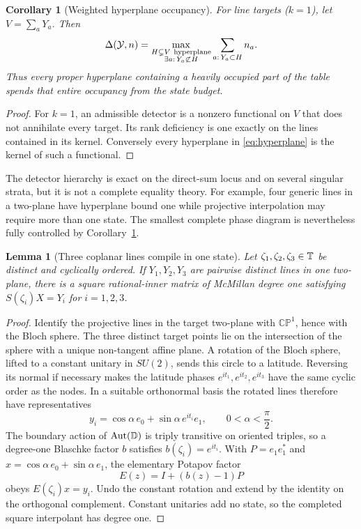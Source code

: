 \documentclass[11pt]{article}
\newtheorem{lemma}[theorem]{Lemma}
\newtheorem{corollary}[theorem]{Corollary}
\theoremstyle{definition}\newtheorem{definition}[theorem]{Definition}\newtheorem{example}[theorem]{Example}
\theoremstyle{remark}\newtheorem{remark}[theorem]{Remark}\newtheorem{limitation}[theorem]{Limitation}
\begin{document}
\begin{corollary}[Weighted hyperplane occupancy]\label{cor:hyperplane}
For line targets ($k=1$), let $V=\sum_aY_a$.  Then
\begin{equation}\label{eq:hyperplane}
 \Delta(\mathcal Y,n)=
 \max_{\substack{H\subsetneq V\ {\rm hyperplane}\\
                  \exists a:\,Y_a\not\subset H}}
       \sum_{a:\,Y_a\subset H}n_a.
\end{equation}
Thus every proper hyperplane containing a heavily occupied part of the table
spends that entire occupancy from the state budget.
\end{corollary}

\begin{proof}
For $k=1$, an admissible detector is a nonzero functional on $V$ that does
not annihilate every target.  Its rank deficiency is one exactly on the
lines contained in its kernel.  Conversely every hyperplane in
\eqref{eq:hyperplane} is the kernel of such a functional.
\end{proof}

The detector hierarchy is exact on the direct-sum locus and on several
singular strata, but it is not a complete equality theory.  For example,
four generic lines in a two-plane have hyperplane bound one while projective
interpolation may require more than one state.  The smallest complete phase
diagram is nevertheless fully controlled by Corollary~\ref{cor:hyperplane}.

\begin{lemma}[Three coplanar lines compile in one state]\label{lem:cp1}
Let $\zeta_1,\zeta_2,\zeta_3\in\mathbb T$ be distinct and cyclically ordered.  If
$Y_1,Y_2,Y_3$ are pairwise distinct lines in one two-plane, there is a square
rational-inner matrix of McMillan degree one satisfying
$S(\zeta_i)X=Y_i$ for $i=1,2,3$.
\end{lemma}

\begin{proof}
Identify the projective lines in the target two-plane with
$\mathbb{CP}^1$, hence with the Bloch sphere.  The three distinct target points lie
on the intersection of the sphere with a unique non-tangent affine plane.
A rotation of the Bloch sphere, lifted to a constant unitary in $SU(2)$,
sends this circle to a latitude.  Reversing its normal if necessary makes
the latitude phases $e^{it_1},e^{it_2},e^{it_3}$ have the same cyclic order
as the nodes.  In a suitable orthonormal basis the rotated lines therefore
have representatives
\begin{equation}\label{eq:latitude}
 y_i=\cos\alpha\,e_0+\sin\alpha\,e^{it_i}e_1,
 \qquad 0<\alpha<\frac{\pi}{2}.
\end{equation}
The boundary action of $\operatorname{Aut}(\mathbb D)$ is triply transitive on
oriented triples, so a degree-one Blaschke factor $b$ satisfies
$b(\zeta_i)=e^{it_i}$.  With $P=e_1e_1^*$ and
$x=\cos\alpha\,e_0+\sin\alpha\,e_1$, the elementary Potapov factor
\[
 E(z)=I+(b(z)-1)P
\]
obeys $E(\zeta_i)x=y_i$.  Undo the constant rotation and extend by the
identity on the orthogonal complement.  Constant unitaries add no state, so
the completed square interpolant has degree one.
\end{proof}
\end{document}
